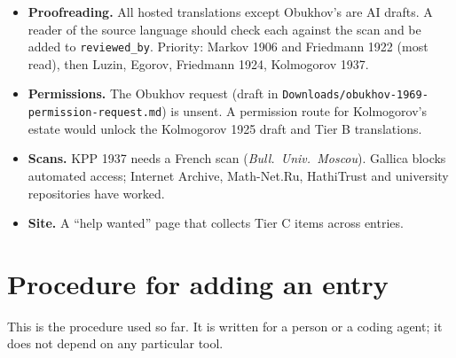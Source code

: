 \documentclass[11pt]{article}
\begin{document}
\begin{itemize}
\item \textbf{Proofreading.} All hosted translations except Obukhov's are AI drafts. A reader of the source language should check each against the scan and be added to \texttt{reviewed\_by}. Priority: Markov 1906 and Friedmann 1922 (most read), then Luzin, Egorov, Friedmann 1924, Kolmogorov 1937.
\item \textbf{Permissions.} The Obukhov request (draft in \texttt{Downloads/obukhov-1969-permission-request.md}) is unsent. A permission route for Kolmogorov's estate would unlock the Kolmogorov 1925 draft and Tier B translations.
\item \textbf{Scans.} KPP 1937 needs a French scan (\emph{Bull.\ Univ.\ Moscou}). Gallica blocks automated access; Internet Archive, Math-Net.Ru, HathiTrust and university repositories have worked.
\item \textbf{Site.} A ``help wanted'' page that collects Tier C items across entries.
\end{itemize}

\section{Procedure for adding an entry}

This is the procedure used so far. It is written for a person or a coding agent; it does not depend on any particular tool.
\end{document}
